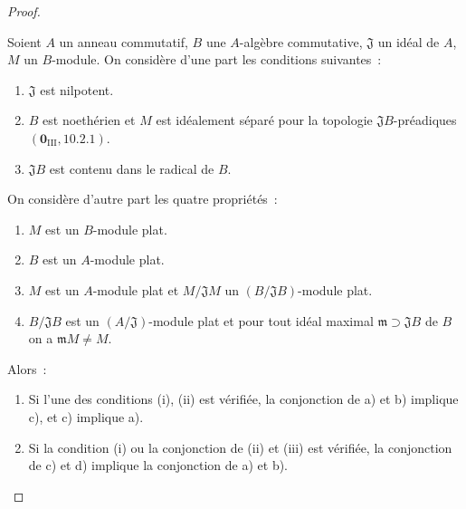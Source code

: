 \begin{proof}
\begin{lemma}[11.3.10.2]
\label{IV.11.3.10.2-fr}
Soient $A$ un anneau commutatif, $B$ une $A$-algèbre commutative,
$\mathfrak J$ un idéal de $A$, $M$ un $B$-module. On considère d'une part les
conditions suivantes~:
\begin{enumerate}[label=\emph{(\roman*)}]
\item $\mathfrak J$ est nilpotent.
\item $B$ est noethérien et $M$ est idéalement séparé pour la topologie
$\mathfrak JB$-préadiques $(\mathbf 0_{\mathrm{III}},10.2.1)$.
\item $\mathfrak JB$ est contenu dans le radical de $B$.
\end{enumerate}
On considère d'autre part les quatre propriétés~:
\begin{enumerate}[label=\emph{\alph*)}]
\item $M$ est un $B$-module plat.
\item $B$ est un $A$-module plat.
\item $M$ est un $A$-module plat et $M/\mathfrak JM$ un
$(B/\mathfrak JB)$-module plat.
\item $B/\mathfrak JB$ est un $(A/\mathfrak J)$-module plat et pour tout idéal
maximal $\mathfrak m\supset\mathfrak JB$ de $B$ on a $\mathfrak mM\neq M$.
\end{enumerate}
Alors~:
\begin{enumerate}[label=\arabic{enumi}\textsuperscript{o}]
\item Si l'une des conditions (i), (ii) est vérifiée, la conjonction de a) et
b) implique c), et c) implique a).


\item Si la condition (i) ou la conjonction de (ii) et (iii) est vérifiée, la
conjonction de c) et d) implique la conjonction de a) et b).
\end{enumerate}
\end{lemma}


\end{proof}
